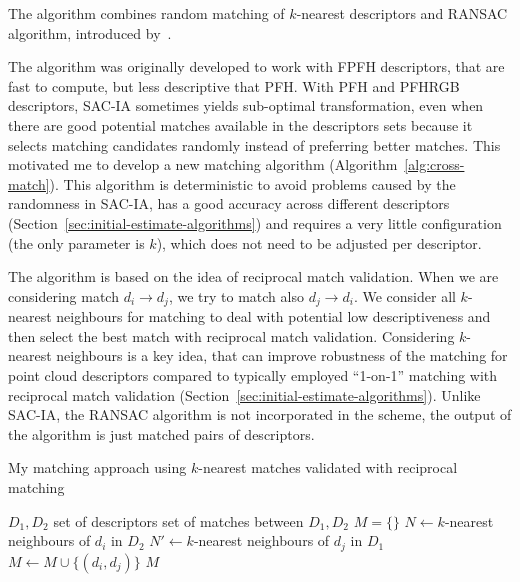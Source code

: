 The algorithm combines random matching of $k$-nearest descriptors and \gls{RANSAC} algorithm, introduced by~\citet{fischler1981ransac}.

The algorithm was originally developed to work with \gls{FPFH} descriptors, that are fast to compute, but less descriptive that \gls{PFH}. With \gls{PFH} and \gls{PFHRGB} descriptors, \gls{SAC-IA} sometimes yields sub-optimal transformation, even when there are good potential matches available in the descriptors sets because it selects matching candidates randomly instead of preferring better matches. This motivated me to develop a new matching algorithm (Algorithm~\ref{alg:cross-match}). This algorithm is deterministic to avoid problems caused by the randomness in \gls{SAC-IA}, has a good accuracy across different descriptors (Section~\ref{sec:initial-estimate-algorithms}) and requires a very little configuration (the only parameter is $k$), which does not need to be adjusted per descriptor.

The algorithm is based on the idea of reciprocal match validation. When we are considering match $d_i \rightarrow d_j$, we try to match also $d_j \rightarrow d_i$. We consider all $k$-nearest neighbours for matching to deal with potential low descriptiveness and then select the best match with reciprocal match validation. Considering $k$-nearest neighbours is a key idea, that can improve robustness of the matching for point cloud descriptors compared to typically employed ``1-on-1'' matching with reciprocal match validation (Section~\ref{sec:initial-estimate-algorithms}). Unlike \gls{SAC-IA}, the \gls{RANSAC} algorithm is not incorporated in the scheme, the output of the algorithm is just matched pairs of descriptors.

\begin{algorithm}
    \caption[Reciprocal $k$-nearest matching]{My matching approach using $k$-nearest matches validated with reciprocal matching}
    \label{alg:cross-match}
    \begin{algorithmic}[1]
        \Require $D_1, D_2$ set of descriptors
        \Ensure set of matches between $D_1, D_2$
            \State $M = \{\}$
                \State $N \gets k$-nearest neighbours of $d_i$ in $D_2$
                    \State $N' \gets k$-nearest neighbours of $d_j$ in $D_1$
                        \State $M \gets M \cup \{(d_i, d_j)\}$
                    \EndIf
                \EndFor
            \EndFor
            \State \Return $M$
        \EndFunction
    \end{algorithmic}
\end{algorithm}

